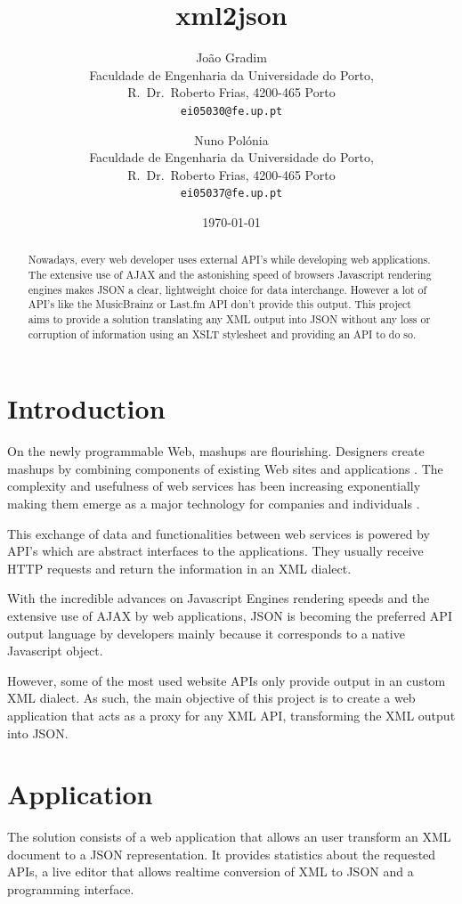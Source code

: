 \documentclass[twocolumn,twoside,10pt,a4paper]{article}
\title{xml2json}
\author{João Gradim\\
\small Faculdade de Engenharia da Universidade do Porto,\\[-0.8ex]
\small R.\ Dr.\ Roberto Frias, 4200-465 Porto\\[-0.8ex]
\small \texttt{ei05030@fe.up.pt}\\
\and
Nuno Polónia\\
\small Faculdade de Engenharia da Universidade do Porto,\\[-0.8ex]
\small R.\ Dr.\ Roberto Frias, 4200-465 Porto\\[-0.8ex]
\small \texttt{ei05037@fe.up.pt}
}
\date{\today}
\begin{document}
\maketitle
\thispagestyle{plain}

\begin{abstract}
Nowadays, every web developer uses external API's while developing web applications. The extensive use of AJAX and the astonishing speed of browsers Javascript rendering engines makes JSON a clear, lightweight choice for data interchange. However a lot of API's like the MusicBrainz or Last.fm API don't provide this output. This project aims to provide a solution translating any XML output into JSON without any loss or corruption of information using an XSLT stylesheet and providing an API to do so.
\end{abstract}

\section{Introduction}\label{sec:intro}
On the newly programmable Web, mashups are flourishing. Designers create mashups by combining components of existing Web sites and applications \cite{maximilien}. The complexity and usefulness of web services has been increasing exponentially making them emerge as a major technology for companies and individuals \cite{benslimane}.

This exchange of data and functionalities between web services is powered by API's which are abstract interfaces to the applications. They usually receive HTTP requests and return the information in an XML dialect.

With the incredible advances on Javascript Engines rendering speeds and the extensive use of AJAX by web applications, JSON is becoming the preferred API output language by developers mainly because it corresponds to a native Javascript object.

However, some of the most used website APIs only provide output in an custom XML dialect. As such, the main objective of this project is to create a web application that acts as a proxy for any XML API, transforming the XML output into JSON.

\section{Application}\label{sec:application}

The solution consists of a web application that allows an user transform an XML document to a JSON representation. It provides statistics about the requested APIs, a live editor that allows realtime conversion of XML to JSON and a programming interface.
\end{document}

